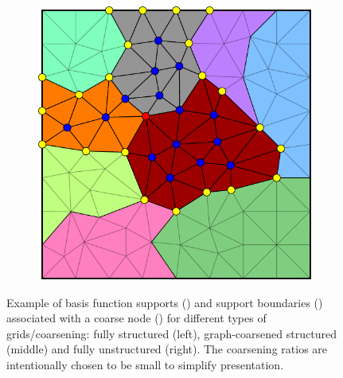 \begin{figure}[htbp]
\begin{subfigure}[t]{0.3\textwidth}
  \end{subfigure}
  \hfill
  \begin{subfigure}[t]{0.3\textwidth}
    \centerline{\includegraphics[width=0.9\linewidth]{figs/square_tria_metis_node_supp}}
  \end{subfigure}
  \caption[Nodal basis function support grid examples]{\label{fig:square_node_supp} Example of basis function supports () and support boundaries () associated with a coarse node () for different types of grids/coarsening: fully structured (left), graph-coarsened structured (middle) and fully unstructured (right).   The coarsening ratios are intentionally chosen to be small to simplify presentation.}
\end{figure}

